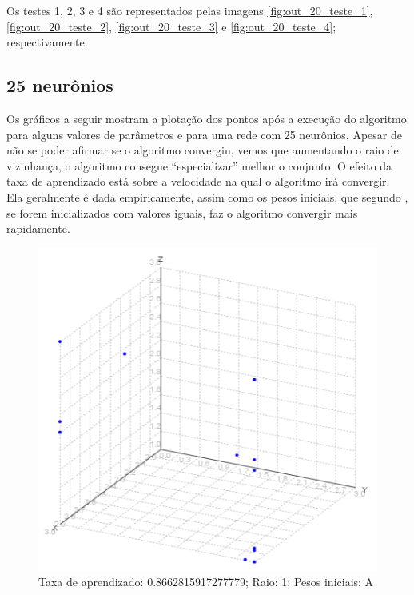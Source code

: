 Os testes 1, 2, 3 e 4 são representados pelas imagens \ref{fig:out_20_teste_1}, \ref{fig:out_20_teste_2}, \ref{fig:out_20_teste_3} e \ref{fig:out_20_teste_4}; respectivamente.


\subsection{25 neurônios}
Os gráficos a seguir mostram a plotação dos pontos após a execução do algoritmo para alguns valores de parâmetros e para 
uma rede com 25 neurônios. Apesar de não se poder afirmar se o algoritmo convergiu, vemos que aumentando o raio de vizinhança,
o algoritmo consegue ``especializar'' melhor o conjunto. O efeito da taxa de aprendizado está sobre a velocidade na qual o 
algoritmo irá convergir. Ela geralmente é dada empiricamente, assim como os pesos iniciais, que segundo \cite{Kohonen}, se forem
inicializados com valores iguais, faz o algoritmo convergir mais rapidamente.

\begin{figure}[ht!]
	\centering
	\includegraphics[scale=0.4]{./imgs/2a1.png}
	\caption{Taxa de aprendizado: 0.8662815917277779; Raio: 1; Pesos iniciais: A}
\end{figure}

